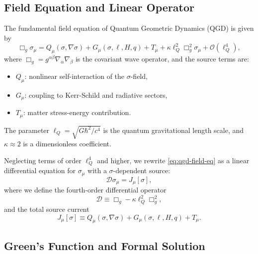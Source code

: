 \documentclass[11pt,a4paper]{article}
\theoremstyle{definition}
\theoremstyle{remark}
\begin{document}
	\subsection{Field Equation and Linear Operator}
	
	The fundamental field equation of Quantum Geometric Dynamics (QGD) is given by
	\begin{equation}
		\boxed{\Box_g \sigma_\mu = Q_\mu(\sigma,\nabla\sigma) + G_\mu(\sigma,\ell,H,q) + T_\mu + \kappa\ell_Q^2 \Box_g^2 \sigma_\mu + \mathcal{O}(\ell_Q^4)},
		\label{eq:qgd-field-eq}
	\end{equation}
	where $\Box_g = g^{\alpha\beta}\nabla_\alpha\nabla_\beta$ is the covariant wave operator, and the source terms are:
	\begin{itemize}
		\item $Q_\mu$: nonlinear self-interaction of the $\sigma$-field,
		\item $G_\mu$: coupling to Kerr-Schild and radiative sectors,
		\item $T_\mu$: matter stress-energy contribution.
	\end{itemize}
	The parameter $\ell_Q = \sqrt{G\hbar^2/c^4}$ is the quantum gravitational length scale, and $\kappa \approx 2$ is a dimensionless coefficient.
	
	Neglecting terms of order $\ell_Q^4$ and higher, we rewrite \eqref{eq:qgd-field-eq} as a linear differential equation for $\sigma_\mu$ with a $\sigma$-dependent source:
	\begin{equation}
		\mathcal{D} \sigma_\mu = J_\mu[\sigma],
		\label{eq:linear-operator}
	\end{equation}
	where we define the fourth-order differential operator
	\begin{equation}
		\mathcal{D} \equiv \Box_g - \kappa\ell_Q^2 \Box_g^2,
		\label{eq:d-operator}
	\end{equation}
	and the total source current
	\begin{equation}
		J_\mu[\sigma] \equiv Q_\mu(\sigma,\nabla\sigma) + G_\mu(\sigma,\ell,H,q) + T_\mu.
		\label{eq:source-current}
	\end{equation}
	
	\subsection{Green's Function and Formal Solution}
	
\end{document}
